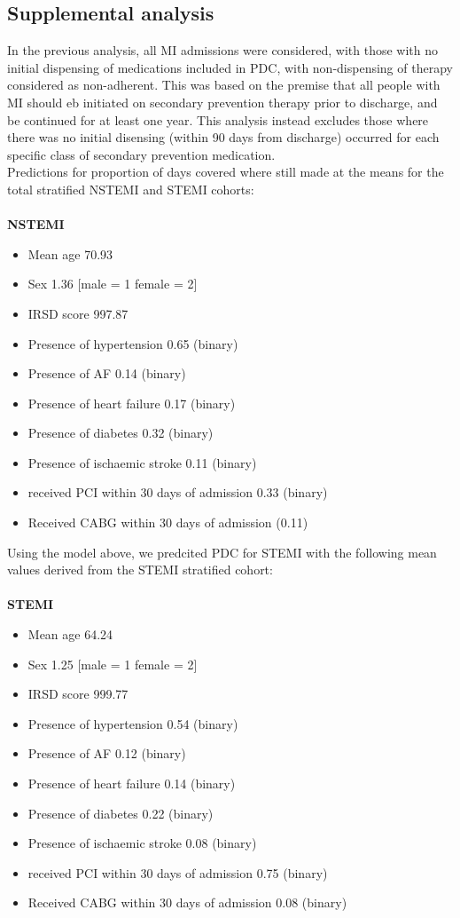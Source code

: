 \documentclass[11pt]{article}
\begin{document}
\subsection{Supplemental analysis}
In the previous analysis, all MI admissions were considered, with those with no initial dispensing of medications included in PDC, with non-dispensing of therapy considered as non-adherent. This was based on the premise that all people with MI should eb initiated on secondary prevention therapy prior to discharge, and be continued for at least one year. This analysis instead excludes those where there was no initial disensing (within 90 days from discharge) occurred for each specific class of secondary prevention medication.\\
Predictions for proportion of days covered where still made at the means for the total stratified NSTEMI and STEMI cohorts:\\~\\
\textbf{NSTEMI}
\begin{itemize}
\item Mean age 70.93
\item Sex 1.36 [male = 1 female = 2]
\item IRSD score 997.87
\item Presence of hypertension 0.65 (binary)
\item Presence of AF 0.14 (binary)
\item Presence of heart failure 0.17 (binary)
\item Presence of diabetes 0.32 (binary)
\item Presence of ischaemic stroke 0.11 (binary)
\item received PCI within 30 days of admission 0.33 (binary)
\item Received CABG within 30 days of admission (0.11)
\end{itemize}

Using the model above, we predcited PDC for STEMI with the following mean values derived from the STEMI stratified cohort: \\~\\
\textbf{STEMI}
\begin{itemize}
\item Mean age 64.24
\item Sex 1.25 [male = 1 female = 2]
\item IRSD score 999.77
\item Presence of hypertension 0.54 (binary)
\item Presence of AF 0.12 (binary)
\item Presence of heart failure 0.14 (binary)
\item Presence of diabetes 0.22 (binary)
\item Presence of ischaemic stroke 0.08 (binary)
\item received PCI within 30 days of admission 0.75 (binary)
\item Received CABG within 30 days of admission 0.08 (binary)
\end{itemize}
\end{document}
